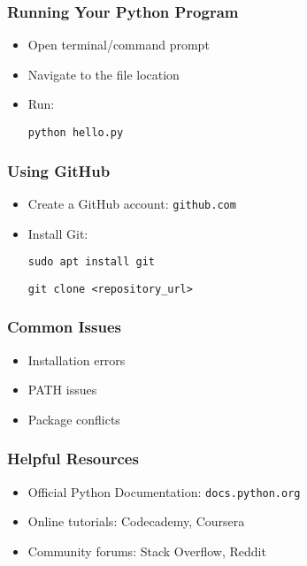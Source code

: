 \documentclass{beamer}
\begin{document}
\begin{frame}
    \frametitle{Running Your Python Program}
    \begin{itemize}
        \item Open terminal/command prompt
        \item Navigate to the file location
        \item Run:
        \begin{tcolorbox}[colback=lightblue, colframe=darkblue, title=Run Program]
            \lstinline|python hello.py|
        \end{tcolorbox}
    \end{itemize}
\end{frame}

\begin{frame}
    \frametitle{Using GitHub}
    \begin{itemize}
        \item Create a GitHub account: \texttt{github.com}
        \item Install Git:
        \begin{tcolorbox}[colback=lightblue, colframe=darkblue, title=Install Git]
            \lstinline|sudo apt install git| 
        \end{tcolorbox}
        \begin{tcolorbox}[colback=lightblue, colframe=darkblue, title=Clone Repository]
            \lstinline|git clone <repository_url>|
        \end{tcolorbox}
        
        \end{itemize}

\end{frame}


\begin{frame}
    \frametitle{Common Issues}
    \begin{itemize}
        \item Installation errors
        \item PATH issues
        \item Package conflicts
    \end{itemize}
\end{frame}

\begin{frame}
    \frametitle{Helpful Resources}
    \begin{itemize}
        \item Official Python Documentation: \texttt{docs.python.org}
        \item Online tutorials: Codecademy, Coursera
        \item Community forums: Stack Overflow, Reddit
    \end{itemize}
\end{frame}
\end{document}
